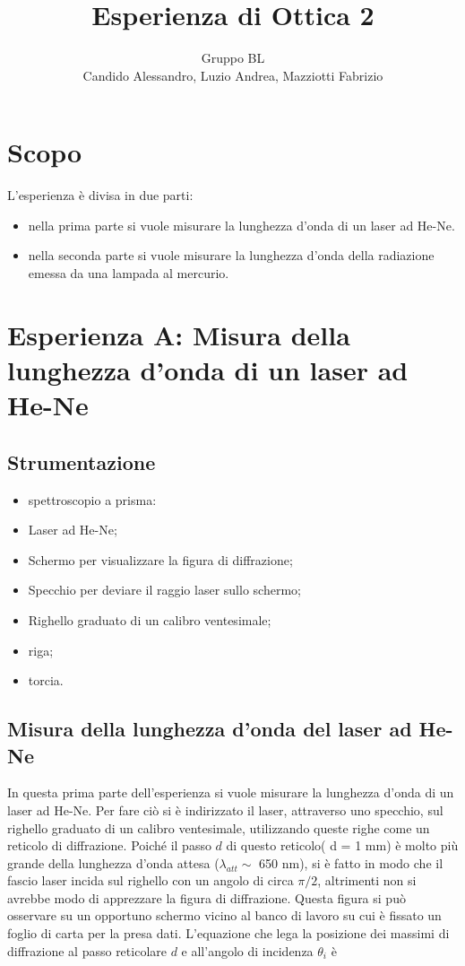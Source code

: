 \documentclass[a4paper,10pt]{article}
\title{Esperienza di Ottica 2}
\author{Gruppo BL \\ Candido Alessandro, Luzio Andrea, Mazziotti Fabrizio}
\begin{document}
\maketitle

\section{Scopo}
L'esperienza è divisa in due parti:
\begin{itemize}
	\item nella prima parte si vuole misurare la lunghezza d'onda di un laser ad He-Ne.
	\item nella seconda parte si vuole misurare la lunghezza d'onda della radiazione emessa da una lampada al mercurio.
\end{itemize}

\section{Esperienza A: Misura della lunghezza d'onda di un laser ad He-Ne}

\subsection{Strumentazione}

\begin{itemize}
	\item spettroscopio a prisma:
	\item Laser ad He-Ne;
	\item Schermo per visualizzare la figura di diffrazione;
	\item Specchio per deviare il raggio laser sullo schermo;
	\item Righello graduato di un calibro ventesimale;
	\item riga;
	\item torcia.
\end{itemize}

\subsection{Misura della lunghezza d'onda del laser ad He-Ne}
In questa prima parte dell'esperienza si vuole misurare la lunghezza d'onda di un laser ad He-Ne. Per fare ciò si è indirizzato il laser, attraverso uno specchio, sul righello graduato di un calibro ventesimale, utilizzando queste righe come un reticolo di diffrazione. Poiché il passo $d$ di questo reticolo( d = 1 mm) è molto più grande della lunghezza d'onda attesa ($\lambda_{att} \sim$ 650 nm), si è fatto in modo che il fascio laser incida sul righello con un angolo di circa $\pi/2$, altrimenti non si avrebbe modo di apprezzare la figura di diffrazione.
Questa figura si può osservare su un opportuno schermo vicino al banco di lavoro su cui è fissato un foglio di carta per la presa dati.
L'equazione che lega la posizione dei massimi di diffrazione al passo reticolare $d$ e all'angolo di incidenza $\theta_i$ è
\end{document}
